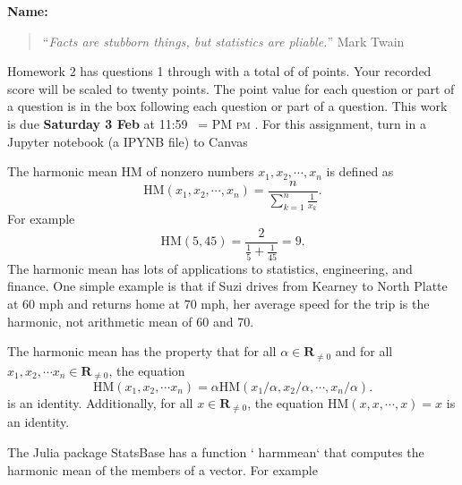 \documentclass[12pt,fleqn]{exam}
\makeatletter
\newcommand{\reals}{\mathbf{R}}
\newcommand{\HM}{\mathrm{HM}}
\newcommand{\quiz}{2}
\newcommand{\term}{Spring}
\DeclareRobustCommand{\maybefakesc}[1]{%
  \ifnum\pdfstrcmp{\f@series}{\bfdefault}=\z@
    {\fontsize{\dimexpr0.8\dimexpr\f@size pt\relax}{0}\selectfont\uppercase{#1}}%
  \else
    \textsc{#1}%
  \fi
}
\newcommand\PM{\,\maybefakesc{pm}\xspace}
\makeatother
\begin{document}
\large
\vspace{0.1in}
\noindent{}
{\bf Name:}  \\
\noindent \makebox[3.0truein][l]{\textbf{Homework \quiz, \term \/ \the\year}}
\vspace{0.1in}

\begin{quote}
“\emph{Facts are stubborn things, but statistics are pliable.}”  \hfill {\sc Mark Twain} 

\end{quote}
\noindent  Homework \quiz\/  has questions 1 through  \numquestions \/ with a total of of  \numpoints\/  points. 
Your recorded score will be scaled to twenty points. The point
value for each question or part of a question is in the box following each question or part of a question.
This work is due \textbf{Saturday 3 Feb  } at 11:59 \PM. For this assignment, turn in a Jupyter notebook (a IPYNB file) to Canvas


\vspace{0.1in}
The harmonic mean $\HM$ of nonzero numbers $x_1, x_2, \cdots, x_n$ is defined as
\begin{equation*}
  \HM(x_1, x_2, \cdots, x_n) = \frac{n}{\sum_{k=1}^n \frac{1}{x_k}}.
\end{equation*}
For example
\begin{equation*}
  \HM(5,45) = \frac{2}{\frac{1}{5} + \frac{1}{45}} = 9.
\end{equation*}
The harmonic mean has lots of applications to statistics, engineering, and finance.   One simple example is that if
Suzi drives from Kearney to North Platte at 60 mph and returns home at 70 mph, her average speed for the trip
is the harmonic, not arithmetic mean of 60 and 70.

The harmonic mean has the property that for all $\alpha \in \reals_{\neq 0}$ and for all $x_1, x_2, \cdots x_n \in \reals_{\neq 0}$,
the equation
\begin{equation*}
  \HM(x_1, x_2, \cdots x_n) =\alpha  \HM(x_1 / \alpha , x_2 /\alpha , \cdots, x_n/\alpha ).
\end{equation*}
is an identity. Additionally, for all $x \in \reals_{\neq 0}$, the equation
$  \HM(x,x, \cdots ,x ) =x$ is an identity.

The Julia package   StatsBase has a function ` harmmean` that computes the harmonic mean of the members
of a vector. For example
\end{document}
